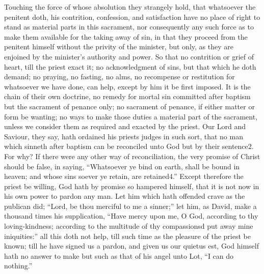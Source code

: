 Touching the force of whose absolution they strangely hold, that whatsoever the penitent doth, his contrition, confession, and satisfaction have no place of right to stand as material parts in this sacrament, nor consequently any such force as to make them available for the taking away of sin, in that they proceed from the penitent himself without the privity of the minister, but only, as they are enjoined by the minister’s authority and power. So that no contrition or grief of heart, till the priest exact it; no acknowledgment of sins, but that which he doth demand; no praying, no fasting, no alms, no recompense or restitution for whatsoever we have done, can help, except by him it be first imposed. It is the chain of their own doctrine, no remedy for mortal sin committed after baptism but the sacrament of penance only; no sacrament of penance, if either matter or form be wanting; no ways to make those duties a material part of the sacrament, unless we consider them as required and exacted by the priest. Our Lord and Saviour, they say, hath ordained his priests judges in such sort, that no man which sinneth after baptism can be reconciled unto God but by their sentence2. For why? If there were any other way of reconciliation, the very promise of Christ should be false, in saying, “Whatsoever ye bind on earth, shall be bound in heaven; and whose sins soever ye retain, are retained4.” Except therefore the priest be willing, God hath by promise so hampered himself, that it is not now in his own power to pardon any man. Let him which hath offended crave as the publican did; “Lord, be thou  merciful to me a sinner;” let him, as David, make a thousand times his supplication, “Have mercy upon me, O God, according to thy loving-kindness; according to the multitude of thy compassionsd put away mine iniquities:” all this doth not help, till such time as the pleasure of the priest be known; till he have signed us a pardon, and given us our quietus est, God himself hath no answer to make but such as that of his angel unto Lot, “I can do nothing.”

